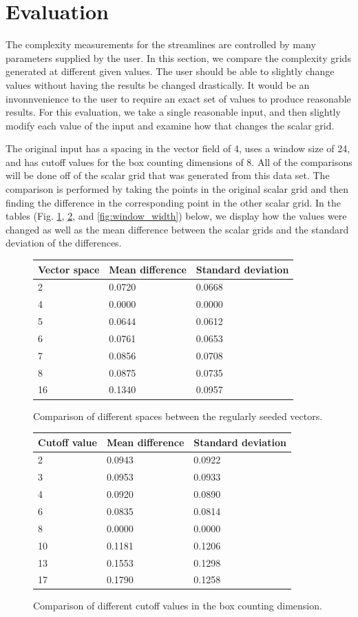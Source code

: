 \documentclass{egpubl}
\begin{document}
\section{Evaluation} \label{sec:evaluations}

The complexity measurements for the streamlines are controlled by many parameters supplied by the user. 
In this section, we compare the complexity grids generated at different given values.
The user should be able to slightly change values without having the results be changed drastically.
It would be an invonnvenience to the user to require an exact set of values to produce reasonable results.
For this evaluation, we take a single reasonable input, and then slightly modify each value of the input and examine how that changes the scalar grid.

The original input has a spacing in the vector field of 4, uses a window size of 24, and has cutoff values for the box counting dimensions of 8.
All of the comparisons will be done off of the scalar grid that was generated from this data set.
The comparison is performed by taking the points in the original scalar grid and then finding the difference in the corresponding point in the other scalar grid.
In the tables (Fig. \ref{fig:v_gap}, \ref{fig:cutoff}, and \ref{fig:window_width}) below, we display how the values were changed as well as the mean difference between the scalar grids and the standard deviation of the differences.

\begin{figure}[h]
\begin{tabular}{|l|l|l|}
   \hline
    Vector space & Mean difference  & Standard deviation\\
    \hline
2&0.0720&0.0668\\
4&0.0000&0.0000\\
5&0.0644&0.0612\\
6&0.0761&0.0653\\
7&0.0856&0.0708\\
8&0.0875&0.0735\\
16&0.1340&0.0957\\
     \hline
\end{tabular}
\caption{Comparison of different spaces between the regularly seeded vectors.}
\label{fig:v_gap}
\end{figure}

\begin{figure}[h]
\begin{tabular}{|l|l|l|}
   \hline
    Cutoff value & Mean difference  & Standard deviation\\
    \hline
2&0.0943&0.0922\\
3&0.0953&0.0933\\
4&0.0920&0.0890\\
6&0.0835&0.0814\\
8&0.0000&0.0000\\
10&0.1181&0.1206\\
13&0.1553&0.1298\\
17&0.1790&0.1258\\
     \hline
\end{tabular}
\caption{Comparison of different cutoff values in the box counting dimension.}
\label{fig:cutoff}
\end{figure}
\end{document}
